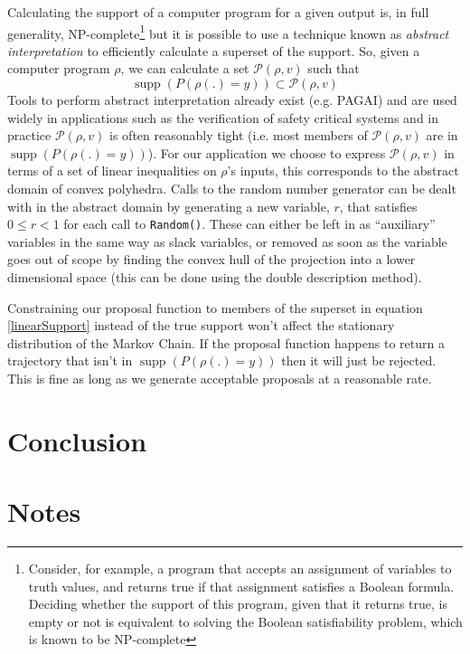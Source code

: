 \documentclass{article}
\DeclareMathOperator\supp{supp}
\begin{document}
Calculating the support of a computer program for a given output is, in full generality, NP-complete\footnote{Consider, for example, a program that accepts an assignment of variables to truth values, and returns true if that assignment satisfies a Boolean formula. Deciding whether the support of this program, given that it returns true, is empty or not is equivalent to solving the Boolean satisfiability problem, which is known to be NP-complete\cite{cook1971complexity}} but it is possible to use a technique known as \textit{abstract interpretation}\cite{cousot1977abstract} to efficiently calculate a superset of the support. So, given a computer program $\rho$, we can calculate a set $\mathcal{P}(\rho, v)$ such that
\[
\supp(P(\rho(.)=y)) \subset \mathcal{P}(\rho, v)
\]
Tools to perform abstract interpretation already exist (e.g. PAGAI\cite{henry2012pagai}) and are used widely in applications such as the verification of safety critical systems\cite{blanchet2003static} and in practice $\mathcal{P}(\rho, v)$ is often reasonably tight (i.e. most members of $\mathcal{P}(\rho, v)$ are in $\supp(P(\rho(.)=y))$). For our application we choose to express $\mathcal{P}(\rho, v)$ in terms of a set of linear inequalities on $\rho$'s inputs, this corresponds to the abstract domain of convex polyhedra\cite{cousot1978automatic}\cite{becchi2018efficient}. Calls to the random number generator can be dealt with in the abstract domain by generating a new variable, $r$, that satisfies $0 \le r < 1$ for each call to \texttt{Random()}. These can either be left in as ``auxiliary'' variables in the same way as slack variables, or removed as soon as the variable goes out of scope by finding the convex hull of the projection into a lower dimensional space (this can be done using the double description method\cite{motzkin1953double}).


Constraining our proposal function to members of the superset in equation \eqref{linearSupport} instead of the true support won't affect the stationary distribution of the Markov Chain. If the proposal function happens to return a trajectory that isn't in $\supp(P(\rho(.)=y))$ then it will just be rejected. This is fine as long as we generate acceptable proposals at a reasonable rate.

\section{Conclusion}

\section{Notes}
\end{document}
